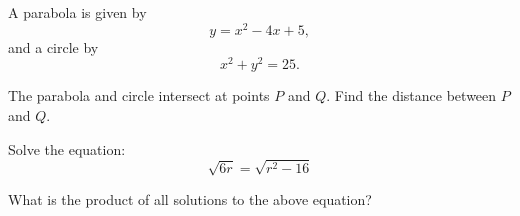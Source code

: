 
\vspace{2em}

\noindent\markforreview
\vspace{1em}

A parabola is given by
\[
y = x^2 - 4x + 5,
\]
and a circle by
\[
x^2 + y^2 = 25.
\]

The parabola and circle intersect at points \(P\) and \(Q\). Find the distance between \(P\) and \(Q\).

\newpage
\noindent\markforreview
\vspace{1em}

Solve the equation:
\[
\sqrt{6r} = \sqrt{r^2 - 16}
\]

What is the product of all solutions to the above equation?

\vspace{0.75em}

